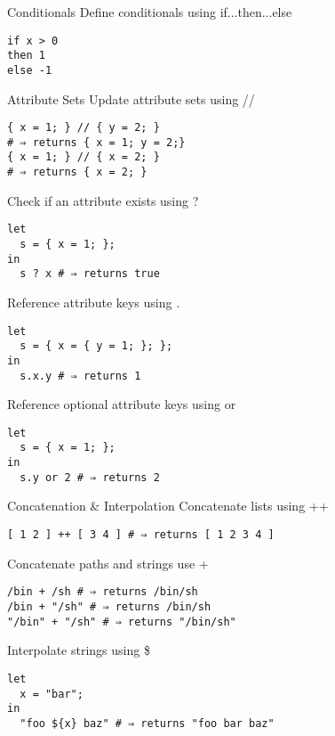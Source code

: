 \documentclass[landscape, 10pt]{article}
\begin{document}
\begin{multicols*}{3}
\begin{ctexpression}{Conditionals}
{\color{nixdarkblue}Define conditionals using} if...then...else
    \begin{verbatim}
if x > 0
then 1
else -1
    \end{verbatim}
\end{ctexpression}

\vfill

\begin{ctexpression}{Attribute Sets}
{\color{nixdarkblue}Update attribute sets using} //
    \begin{verbatim}
{ x = 1; } // { y = 2; }
# ⇒ returns { x = 1; y = 2;}
{ x = 1; } // { x = 2; }
# ⇒ returns { x = 2; }
    \end{verbatim}
    \tcbline
{\color{nixdarkblue}Check if an attribute exists using} ?
    \begin{verbatim}
let
  s = { x = 1; };
in
  s ? x # ⇒ returns true
    \end{verbatim}
    \tcbline
{\color{nixdarkblue}Reference attribute keys using} .
    \begin{verbatim}
let
  s = { x = { y = 1; }; };
in
  s.x.y # ⇒ returns 1
    \end{verbatim}
    \tcbline
{\color{nixdarkblue}Reference optional attribute keys using} or
    \begin{verbatim}
let
  s = { x = 1; };
in
  s.y or 2 # ⇒ returns 2
    \end{verbatim}
\end{ctexpression}

\vfill

\begin{ctexpression}{Concatenation \& Interpolation}
{\color{nixdarkblue}Concatenate lists using} ++
    \begin{verbatim}
[ 1 2 ] ++ [ 3 4 ] # ⇒ returns [ 1 2 3 4 ]
    \end{verbatim}
    \tcbline
{\color{nixdarkblue}Concatenate paths and strings use} +
    \begin{verbatim}
/bin + /sh # ⇒ returns /bin/sh
/bin + "/sh" # ⇒ returns /bin/sh
"/bin" + "/sh" # ⇒ returns "/bin/sh"
    \end{verbatim}
    \tcbline
{\color{nixdarkblue}Interpolate strings using} \$\string{\string}
    \begin{verbatim}
let
  x = "bar";
in
  "foo ${x} baz" # ⇒ returns "foo bar baz"
    \end{verbatim}
\end{ctexpression}


\end{multicols*}
\end{document}
